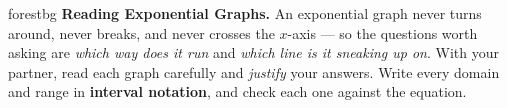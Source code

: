 \documentclass[10pt]{article}
\begin{document}
\namepartnerperiod

\vspace{0.08in}

\begin{headlinebox}{forestbg}
\small\textbf{Reading Exponential Graphs.} An exponential graph never turns around, never breaks, and
never crosses the $x$-axis --- so the questions worth asking are \emph{which way does it run} and
\emph{which line is it sneaking up on}. With your partner, read each graph carefully and
\emph{justify} your answers. Write every domain and range in \textbf{interval notation}, and check
each one against the equation.
\end{headlinebox}

\vspace{0.06in}
\end{document}
